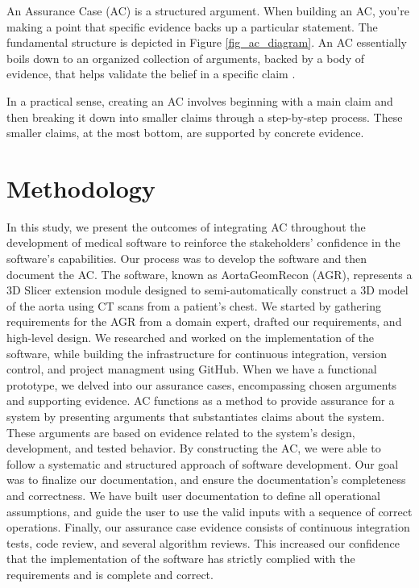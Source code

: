 An Assurance Case (AC) is a structured argument. When building an AC, you're making a point that specific evidence backs up a particular statement. The fundamental structure is depicted in Figure \ref{fig_ac_diagram}. An AC essentially boils down to an organized collection of arguments, backed by a body of evidence, that helps validate the belief in a specific claim \cite{doi:10.2514/6.2009-1921}.

In a practical sense, creating an AC involves beginning with a main claim and then breaking it down into smaller claims through a step-by-step process. These smaller claims, at the most bottom, are supported by concrete evidence.


\section{Methodology} \label{methodology}
In this study, we present the outcomes of integrating AC throughout the development of medical software to reinforce the stakeholders' confidence in the software's capabilities. Our process was to develop the software and then document the AC. The software, known as AortaGeomRecon (AGR), represents a 3D Slicer \cite{Kikinis2014} extension module designed to semi-automatically construct a 3D model of the aorta using CT scans from a patient's chest. We started by gathering requirements for the AGR from a domain expert, drafted our requirements, and high-level design. We researched and worked on the implementation of the software, while building the infrastructure for continuous integration, version control, and project managment using GitHub. When we have a functional prototype, we delved into our assurance cases, encompassing chosen arguments and supporting evidence. AC functions as a method to provide assurance for a system by presenting arguments that substantiates claims about the system. These arguments are based on evidence related to the system's design, development, and tested behavior. By constructing the AC, we were able to follow a systematic and structured approach of software development. Our goal was to finalize our documentation, and ensure the documentation's completeness and correctness. We have built user documentation to define all operational assumptions, and guide the user to use the valid inputs with a sequence of correct operations. Finally, our assurance case evidence consists of continuous integration tests, code review, and several algorithm reviews. This increased our confidence that the implementation of the software has strictly complied with the requirements and is  complete and correct.

